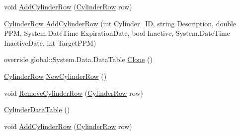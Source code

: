 \begin{DoxyCompactItemize}
\item 
void \hyperlink{class_env_int_1_1_win32_1_1_field_tech_1_1_manager_1_1_data_sets_1_1_guide_ware_mobile_data_set_1_1_cylinder_data_table_af45d27e41736a04745960928e36033ed}{Add\+Cylinder\+Row} (\hyperlink{class_env_int_1_1_win32_1_1_field_tech_1_1_manager_1_1_data_sets_1_1_guide_ware_mobile_data_set_1_1_cylinder_row}{Cylinder\+Row} row)
\item 
\hyperlink{class_env_int_1_1_win32_1_1_field_tech_1_1_manager_1_1_data_sets_1_1_guide_ware_mobile_data_set_1_1_cylinder_row}{Cylinder\+Row} \hyperlink{class_env_int_1_1_win32_1_1_field_tech_1_1_manager_1_1_data_sets_1_1_guide_ware_mobile_data_set_1_1_cylinder_data_table_aaec1ad7d2eb796c3c432c67cb15d6db7}{Add\+Cylinder\+Row} (int Cylinder\+\_\+\+I\+D, string Description, double P\+P\+M, System.\+Date\+Time Expiration\+Date, bool Inactive, System.\+Date\+Time Inactive\+Date, int Target\+P\+P\+M)
\item 
override global\+::\+System.\+Data.\+Data\+Table \hyperlink{class_env_int_1_1_win32_1_1_field_tech_1_1_manager_1_1_data_sets_1_1_guide_ware_mobile_data_set_1_1_cylinder_data_table_acc28d7467e204bb522f9e37fc3654dd5}{Clone} ()
\item 
\hyperlink{class_env_int_1_1_win32_1_1_field_tech_1_1_manager_1_1_data_sets_1_1_guide_ware_mobile_data_set_1_1_cylinder_row}{Cylinder\+Row} \hyperlink{class_env_int_1_1_win32_1_1_field_tech_1_1_manager_1_1_data_sets_1_1_guide_ware_mobile_data_set_1_1_cylinder_data_table_aa16fd02d3df499f1b8f444e0e36027bf}{New\+Cylinder\+Row} ()
\item 
void \hyperlink{class_env_int_1_1_win32_1_1_field_tech_1_1_manager_1_1_data_sets_1_1_guide_ware_mobile_data_set_1_1_cylinder_data_table_add4d002cb111289ab667a4ee14ffeea2}{Remove\+Cylinder\+Row} (\hyperlink{class_env_int_1_1_win32_1_1_field_tech_1_1_manager_1_1_data_sets_1_1_guide_ware_mobile_data_set_1_1_cylinder_row}{Cylinder\+Row} row)
\item 
\hyperlink{class_env_int_1_1_win32_1_1_field_tech_1_1_manager_1_1_data_sets_1_1_guide_ware_mobile_data_set_1_1_cylinder_data_table_a276727c5678c3c1e9b6ed0202e573076}{Cylinder\+Data\+Table} ()
\item 
void \hyperlink{class_env_int_1_1_win32_1_1_field_tech_1_1_manager_1_1_data_sets_1_1_guide_ware_mobile_data_set_1_1_cylinder_data_table_af45d27e41736a04745960928e36033ed}{Add\+Cylinder\+Row} (\hyperlink{class_env_int_1_1_win32_1_1_field_tech_1_1_manager_1_1_data_sets_1_1_guide_ware_mobile_data_set_1_1_cylinder_row}{Cylinder\+Row} row)
\item 

\end{DoxyCompactItemize}
